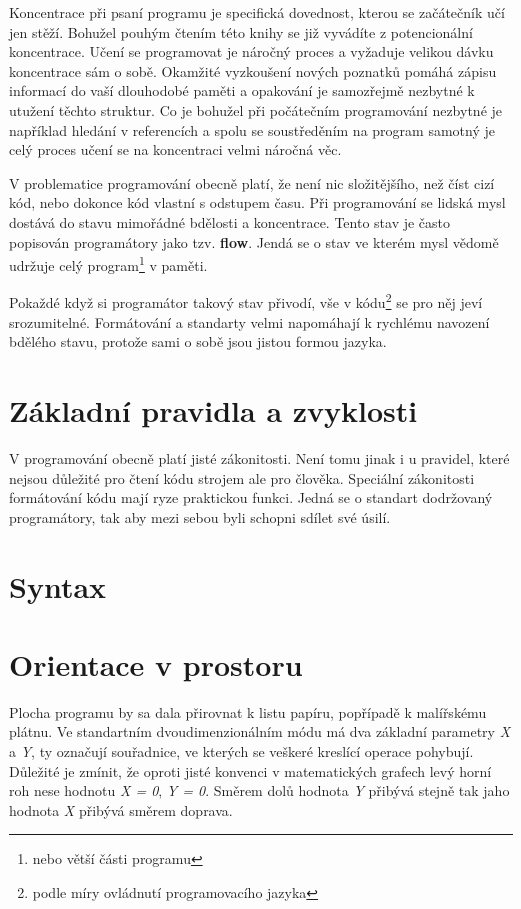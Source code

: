 \documentclass[11pt]{book}
\newcommand{\oddil}[1]{\section{#1}\label{sec:#1}}
\newcommand{\slovnik}[1]{\textbf{\gls{#1}}\index{#1}}
\begin{document}
Koncentrace při psaní programu je specifická dovednost, kterou se začátečník učí jen stěží. Bohužel pouhým čtením této knihy se již vyvádíte z potencionální koncentrace. Učení se programovat je náročný proces a vyžaduje velikou dávku koncentrace sám o sobě. Okamžité vyzkoušení nových poznatků pomáhá zápisu informací do vaší dlouhodobé paměti a opakování je samozřejmě nezbytné k utužení těchto struktur. Co je bohužel při počátečním programování nezbytné je například hledání v referencích a spolu se soustředěním na program samotný je celý proces učení se na koncentraci velmi náročná věc.



V problematice programování obecně platí, že není nic složitějšího, než číst cizí kód, nebo dokonce kód vlastní s odstupem času. Při programování se lidská mysl dostává do stavu mimořádné bdělosti a koncentrace. Tento stav je často popisován programátory jako tzv. \slovnik{flow}. Jendá se o stav ve kterém mysl vědomě udržuje celý program\footnote{nebo větší části programu} v paměti.

Pokaždé když si programátor takový stav přivodí, vše v kódu\footnote{podle míry ovládnutí programovacího jazyka} se pro něj jeví srozumitelné. Formátování a standarty velmi napomáhají k rychlému navození bdělého stavu, protože sami o sobě jsou jistou formou jazyka.

\oddil{Základní pravidla a zvyklosti}

V programování obecně platí jisté zákonitosti. Není tomu jinak i u pravidel, které nejsou důležité pro čtení kódu strojem ale pro člověka. Speciální zákonitosti formátování kódu mají ryze praktickou funkci. Jedná se o standart dodržovaný programátory, tak aby mezi sebou byli schopni sdílet své úsilí.


\oddil{Syntax}


\oddil{Orientace v prostoru}

Plocha programu by sa dala přirovnat k listu papíru, popřípadě k malířskému plátnu. Ve standartním dvoudimenzionálním módu má dva základní parametry {\em X} a {\em Y}, ty označují souřadnice, ve kterých se veškeré kreslící operace pohybují. Důležité je zmínit, že oproti jisté konvenci v matematických grafech levý horní roh nese hodnotu {\em X = 0}, {\em Y = 0}. Směrem dolů hodnota {\em Y} přibývá stejně tak jaho hodnota {\em X} přibývá směrem doprava.\\
\end{document}
